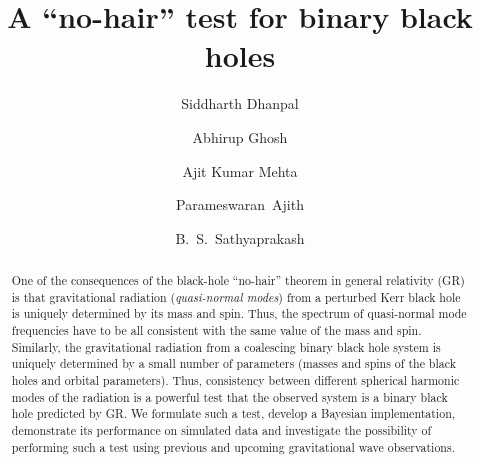 \documentclass[prl,preprintnumbers,twocolumn,eqsecnum,floatfix,a4paper,nofootinbib,superscriptaddress]{revtex4}
\begin{document}
\title{A ``no-hair'' test for binary black holes}

\author{Siddharth Dhanpal}
\author{Abhirup Ghosh}
\author{Ajit Kumar Mehta}
\author{Parameswaran~Ajith}
\author{B.~S.~Sathyaprakash}

\begin{abstract}
One of the consequences of the black-hole ``no-hair'' theorem in general relativity (GR) is that gravitational radiation (\emph{quasi-normal modes}) from a perturbed Kerr black hole is uniquely determined by its mass and spin. Thus, the spectrum of quasi-normal mode frequencies have to be all consistent with the same value of the mass and spin. Similarly, the gravitational radiation from a coalescing binary black hole system is uniquely determined by a small number of parameters (masses and spins of the black holes and orbital parameters). Thus, consistency between different spherical harmonic modes of the radiation is a powerful test that the observed system is a binary black hole predicted by GR. We formulate such a test, develop a Bayesian implementation, demonstrate its performance on simulated data and investigate the possibility of performing such a test using previous and upcoming gravitational wave observations. 
\end{abstract}
\maketitle
\end{document}
